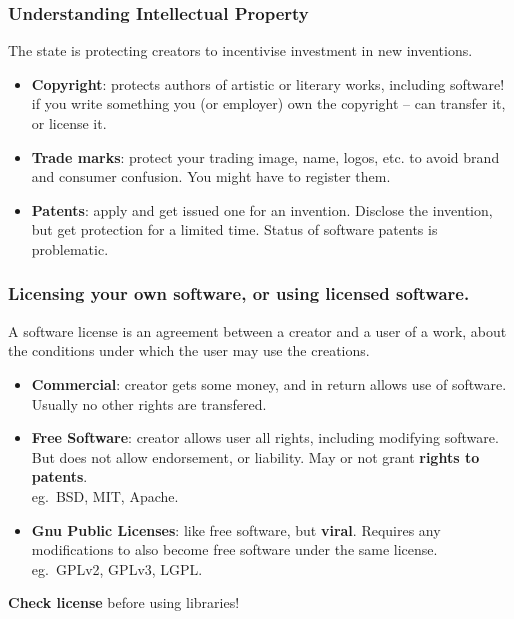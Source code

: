 \documentclass{beamer} %
\newcommand\emc[1]{\textcolor{midred}{\textbf{#1}}}
\begin{document}
\begin{frame}

\frametitle{Understanding Intellectual Property}

The state is protecting creators to incentivise investment in new inventions.
\begin{itemize}
  \item \emc{Copyright}: protects authors of artistic or literary works, including software! if you write something you (or employer) own the copyright -- can transfer it, or license it.
  \item \emc{Trade marks}: protect your trading image, name, logos, etc. to avoid brand and consumer confusion. You might have to register them.
  \item \emc{Patents}: apply and get issued one for an invention. Disclose the invention, but get protection for a limited time. Status of software patents is problematic.
\end{itemize}

\end{frame}

\begin{frame}

\frametitle{Licensing your own software, or using licensed software.}

A software license is an agreement between a creator and a user of a work, about the conditions under which the user may use the creations. 

\begin{itemize}
  \item \emc{Commercial}: creator gets some money, and in return allows use of software. Usually no other rights are transfered.
  \item \emc{Free Software}: creator allows user all rights, including modifying software. But does not allow endorsement, or liability. May or not grant \emc{rights to patents}. \\
  eg.\ BSD, MIT, Apache.
  \item \emc{Gnu Public Licenses}: like free software, but \emc{viral}. Requires any modifications to also become free software under the same license. \\ eg.\ GPLv2, GPLv3, LGPL.
\end{itemize}

\emc{Check license} before using libraries!

\end{frame}
\end{document}
